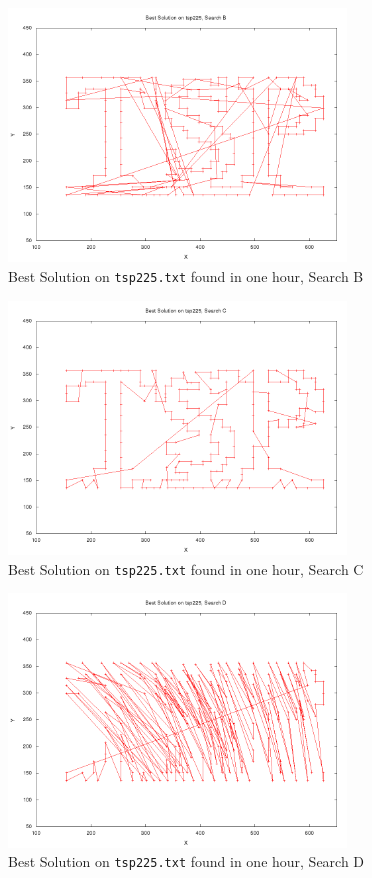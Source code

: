 \documentclass{article}
\begin{document}
\begin{figure}[p]
	\centering
	\includegraphics[width=0.8\textwidth]{../images/paths_search_b.png}
	\caption{Best Solution on {\tt tsp225.txt} found in one hour, Search B}
	\label{fig:paths_search_b}
\end{figure}

\begin{figure}[p]
	\centering
	\includegraphics[width=0.8\textwidth]{../images/paths_search_c.png}
	\caption{Best Solution on {\tt tsp225.txt} found in one hour, Search C}
	\label{fig:paths_search_c}
\end{figure}

\begin{figure}[p]
	\centering
	\includegraphics[width=0.8\textwidth]{../images/paths_search_d.png}
	\caption{Best Solution on {\tt tsp225.txt} found in one hour, Search D}
	\label{fig:paths_search_d}
\end{figure}
\end{document}
